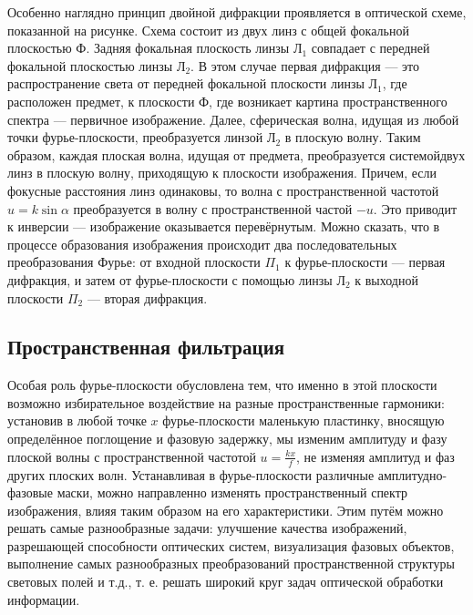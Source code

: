 \begin{figure}[ht!]
\end{figure}

Особенно наглядно принцип двойной дифракции проявляется в оптической схеме, показанной на рисунке. Схема состоит из двух линз с общей фокальной плоскостью Ф. Задняя фокальная плоскость линзы $\text{Л}_1$ совпадает с передней фокальной плоскостью линзы $\text{Л}_2$. В этом случае первая дифракция --- это распространение света от передней фокальной плоскости линзы $\text{Л}_1$, где расположен предмет, к плоскости Ф, где возникает картина пространственного спектра --- первичное изображение. Далее, сферическая волна, идущая из любой точки фурье-плоскости, преобразуется линзой $\text{Л}_2$ в плоскую волну. Таким образом, каждая плоская волна, идущая от предмета, преобразуется системойдвух линз в плоскую волну, приходящую к плоскости изображения. Причем, если фокусные расстояния линз одинаковы, то волна с пространственной частотой $u = k\sin\alpha$ преобразуется в волну с пространственной частой $-u$. Это приводит к инверсии --- изображение оказывается перевёрнутым. Можно сказать, что в процессе образования изображения происходит два последовательных преобразования Фурье: от входной плоскости $\Pi_1$ к фурье-плоскости --- первая дифракция, и затем от фурье-плоскости с помощью линзы $\text{Л}_2$ к выходной плоскости $\Pi_2$ --- вторая дифракция.

\subsection{Пространственная фильтрация}
Особая роль фурье-плоскости обусловлена тем, что именно в этой плоскости возможно избирательное воздействие на разные пространственные гармоники: установив в любой точке $x$ фурье-плоскости маленькую пластинку, вносящую определённое поглощение и фазовую задержку, мы изменим амплитуду и фазу плоской волны с пространственной частотой $u = \frac{kx}{f}$, не изменяя амплитуд и фаз других плоских волн. Устанавливая в фурье-плоскости различные амплитудно-фазовые маски, можно направленно изменять пространственный спектр изображения, влияя таким образом на его характеристики. Этим путём можно решать самые разнообразные задачи: улучшение качества изображений, разрешающей способности оптических систем, визуализация фазовых объектов, выполнение самых разнообразных преобразований пространственной структуры световых полей и т.д., т. е. решать широкий круг задач оптической обработки информации.

